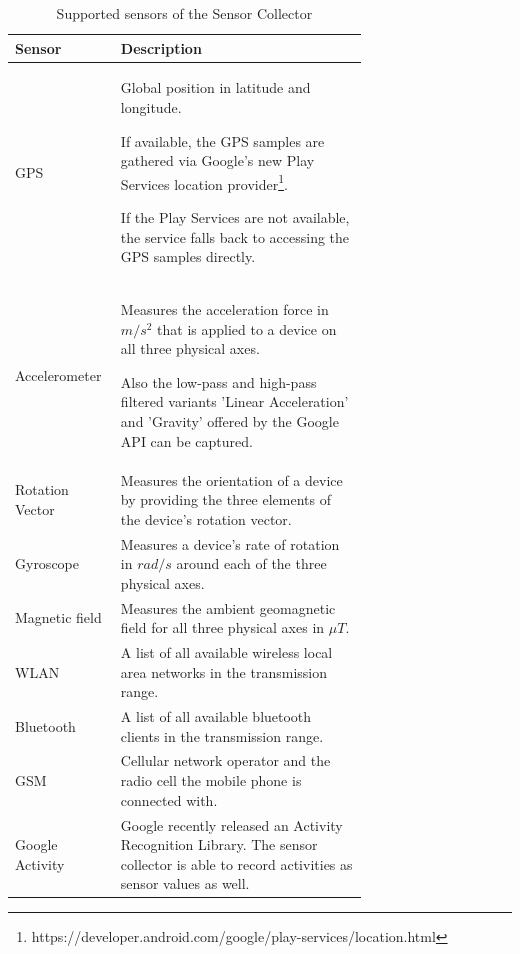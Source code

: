 \begin{table}
\centering
\begin{tabular}{|l|p{0.7\linewidth}|}
  \hline
  Sensor & Description \\
  \hline
  GPS                 & Global position in latitude and longitude. 

                        If available, the GPS samples are gathered via
                        Google's new Play Services location
                        provider\footnote{https://developer.android.com/google/play-services/location.html}.
                        
                        If the Play Services are not available, the service falls back to
                        accessing the GPS samples directly.
  \\ \hline
  Accelerometer       & Measures the acceleration force in $m/s^2$
                        that is applied to a device on all three
                        physical axes. 

                        Also the low-pass and high-pass filtered
                        variants 'Linear Acceleration' and 'Gravity' offered by the Google
                        API can be captured.
  \\ 
  Rotation Vector     & Measures the orientation of a device by
                        providing the three elements of the device's
                        rotation vector.  
  \\
  Gyroscope           & Measures a device's rate of rotation in
                        $rad/s$ around each of the three physical
                        axes. 
  \\ 
  Magnetic field      & Measures the ambient geomagnetic field for all
                        three physical axes in $\mu T$. 
  \\ \hline
  WLAN                & A list of all available wireless local area
                        networks in the transmission range. 
  \\
  Bluetooth           & A list of all available bluetooth clients in
                        the transmission range. 
  \\
  GSM                 & Cellular network operator and the radio cell
                        the mobile phone is connected with. 
  \\ \hline
  Google Activity     & Google recently released an Activity
                        Recognition Library. The sensor collector is able to record activities as sensor
                        values as well. 
  \\
  \hline
\end{tabular}
\caption{Supported sensors of the Sensor Collector}
\label{fig:sensor_table}
\end{table}

